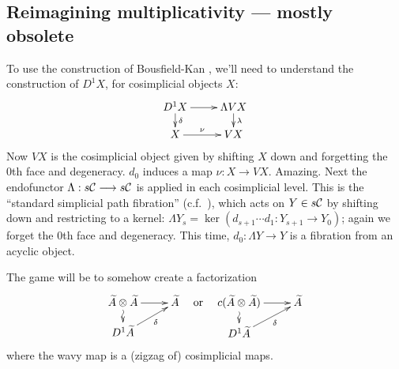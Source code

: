\documentclass[10pt]{article}
\newcommand{\Comm}{\calC}
\begin{document}
\begin{Thoughts on Adams Multiplicativity II}
\section{Reimagining multiplicativity --- mostly obsolete}
To use the construction of Bousfield-Kan \cite{BK_pairings_products.pdf,BK_pairings.pdf}, we'll need to understand the construction of $D^1X$, for cosimplicial objects $X$:
\[\xymatrix@R=4mm{
D^1X\ar[r]
\ar[d]^-{\delta}
&%
\Lambda VX\ar[d]^-{\lambda}
\\%
X\ar[r]^-{\nu}
&%
VX%
}\]
Now $VX$ is the cosimplicial object given by shifting $X$ down and forgetting the 0th face and degeneracy. $d_0$ induces a map $\nu:X\to VX$. Amazing. Next the endofunctor $\Lambda:s\Comm\to s\Comm$ is applied in each cosimplicial level. This is the ``standard simplicial path fibration'' (c.f.\ \cite[p.82]{BousKanSSeq.pdf}), which acts on $Y\in s\Comm$ by shifting down and restricting to a kernel: $\Lambda Y_s=\ker(d_{s+1}\cdots d_1:Y_{s+1}\to Y_0)$; again we forget the 0th face and degeneracy. This time, $d_0:\Lambda Y\to Y$ is a fibration from an acyclic object.

The game will be to somehow create a factorization
\[\xymatrix@R=4mm{
\widetilde{A}\otimes \widetilde{A}\ar[r]\ar@{~>}[d]
&%
\widetilde{A}\\%
D^1\widetilde{A}\ar[ur]_-{\delta}
&%
}\textup{\ \ \ or\ \ \ }
\xymatrix@R=4mm{
c(\widetilde{A}\otimes \widetilde{A})\ar[r]\ar@{~>}[d]
&%
\widetilde{A}\\%
D^1\widetilde{A}\ar[ur]_-{\delta}
&%
}\]
where the wavy map is a (zigzag of) cosimplicial maps.


\end{Thoughts on Adams Multiplicativity II}
\end{document}
